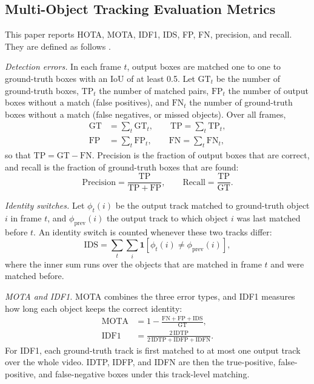 \documentclass[pdflatex,sn-mathphys-num,iicol]{sn-jnl}
\begin{document}
\subsection{Multi-Object Tracking Evaluation Metrics}\label{sec:metrics}
This paper reports HOTA, MOTA, IDF1, IDS, FP, FN, precision, and recall. They
are defined as follows \cite{dendorfer2021motchallenge,luiten2021hota}.

\emph{Detection errors.} In each frame $t$, output boxes are matched one to
one to ground-truth boxes with an IoU of at least 0.5. Let $\mathrm{GT}_t$ be
the number of ground-truth boxes, $\mathrm{TP}_t$ the number of matched pairs,
$\mathrm{FP}_t$ the number of output boxes without a match (false positives),
and $\mathrm{FN}_t$ the number of ground-truth boxes without a match (false
negatives, or missed objects). Over all frames,
\begin{align}
\mathrm{GT}&=\sum_t \mathrm{GT}_t,\qquad \mathrm{TP}=\sum_t \mathrm{TP}_t,\label{eq:gt}\\
\mathrm{FP}&=\sum_t \mathrm{FP}_t,\qquad \mathrm{FN}=\sum_t \mathrm{FN}_t,\label{eq:fpfn}
\end{align}
so that $\mathrm{TP}=\mathrm{GT}-\mathrm{FN}$. Precision is the fraction of
output boxes that are correct, and recall is the fraction of ground-truth
boxes that are found:
\begin{equation}
\mathrm{Precision}=\frac{\mathrm{TP}}{\mathrm{TP}+\mathrm{FP}},\qquad
\mathrm{Recall}=\frac{\mathrm{TP}}{\mathrm{GT}}.
\label{eq:prrc}
\end{equation}

\emph{Identity switches.} Let $\phi_t(i)$ be the output track matched to
ground-truth object $i$ in frame $t$, and $\phi_{\mathrm{prev}}(i)$ the
output track to which object $i$ was last matched before $t$. An identity
switch is counted whenever these two tracks differ:
\begin{equation}
\mathrm{IDS}=\sum_t\sum_{i}\mathbf{1}\!\left[\phi_t(i)\neq\phi_{\mathrm{prev}}(i)\right],
\label{eq:ids}
\end{equation}
where the inner sum runs over the objects that are matched in frame $t$ and
were matched before.

\emph{MOTA and IDF1.} MOTA combines the three error types, and IDF1 measures
how long each object keeps the correct identity:
\begin{align}
\mathrm{MOTA}&=1-\frac{\mathrm{FN}+\mathrm{FP}+\mathrm{IDS}}{\mathrm{GT}},\label{eq:mota}\\
\mathrm{IDF1}&=\frac{2\,\mathrm{IDTP}}{2\,\mathrm{IDTP}+\mathrm{IDFP}+\mathrm{IDFN}}.\label{eq:idf1}
\end{align}
For IDF1, each ground-truth track is first matched to at most one output
track over the whole video. IDTP, IDFP, and IDFN are then the true-positive,
false-positive, and false-negative boxes under this track-level matching.
\end{document}
